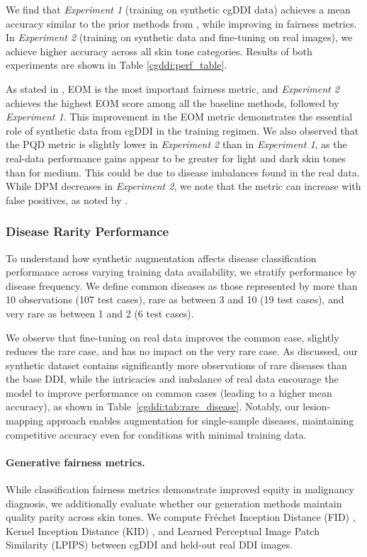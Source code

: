 \documentclass[11pt]{ucthesis}
\begin{document}
We find that \textit{Experiment 1} (training on synthetic cgDDI data) achieves a mean accuracy similar to the prior methods from \cite{du_2023_fairdisco,aayushman-2024}, while improving in fairness metrics. In \textit{Experiment 2} (training on synthetic data and fine-tuning on real images), we achieve higher accuracy across all skin tone categories. Results of both experiments are shown in Table \ref{cgddi:perf_table}. 

As stated in \cite{aayushman-2024}, EOM is the most important fairness metric, and \textit{Experiment 2} achieves the highest EOM score among all the baseline methods, followed by \textit{Experiment 1}. This improvement in the EOM metric demonstrates the essential role of synthetic data from cgDDI in the training regimen. We also observed that the PQD metric is slightly lower in \textit{Experiment 2} than in \textit{Experiment 1}, as the real-data performance gains appear to be greater for light and dark skin tones than for medium. This could be due to disease imbalances found in the real data. While DPM decreases in \textit{Experiment 2}, we note that the metric can increase with false positives, as noted by \cite{aayushman-2024}.

\subsubsection{Disease Rarity Performance}

To understand how synthetic augmentation affects disease classification performance across varying training data availability, we stratify performance by disease frequency. We define common diseases as those represented by more than 10 observations (107 test cases), rare as between 3 and 10 (19 test cases), and very rare as between 1 and 2 (6 test cases).

We observe that fine-tuning on real data improves the common case, slightly reduces the rare case, and has no impact on the very rare case. As discussed, our synthetic dataset contains significantly more observations of rare diseases than the base DDI, while the intricacies and imbalance of real data encourage the model to improve performance on common cases (leading to a higher mean accuracy), as shown in Table~\ref{cgddi:tab:rare_disease}. Notably, our lesion-mapping approach enables augmentation for single-sample diseases, maintaining competitive accuracy even for conditions with minimal training data.

\paragraph{Generative fairness metrics.}
While classification fairness metrics demonstrate improved equity in malignancy diagnosis, we additionally evaluate whether our generation methods maintain quality parity across skin tones. We compute Fréchet Inception Distance (FID) \cite{heusel-2017}, Kernel Inception Distance (KID) \cite{binkowski-2018}, and Learned Perceptual Image Patch Similarity (LPIPS) \cite{zhang2018perceptual} between cgDDI and held-out real DDI images.
\end{document}
